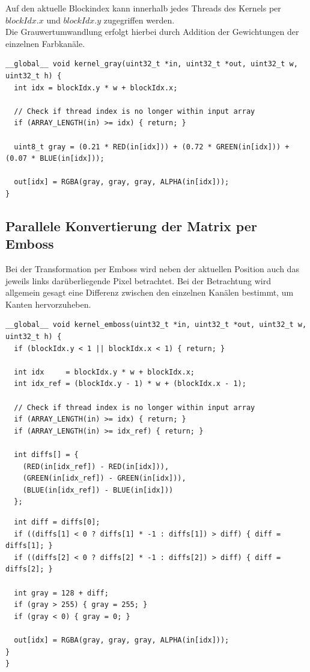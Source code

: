 \documentclass{llncs}
\begin{document}
Auf den aktuelle Blockindex kann innerhalb jedes Threads des Kernels per $blockIdx.x$ und $blockIdx.y$ zugegriffen werden.\\
\newpage
Die Grauwertumwandlung erfolgt hierbei durch Addition der Gewichtungen der einzelnen Farbkanäle. 

\begin{lstlisting}
__global__ void kernel_gray(uint32_t *in, uint32_t *out, uint32_t w, uint32_t h) {
  int idx = blockIdx.y * w + blockIdx.x;

  // Check if thread index is no longer within input array
  if (ARRAY_LENGTH(in) >= idx) { return; }

  uint8_t gray = (0.21 * RED(in[idx])) + (0.72 * GREEN(in[idx])) + (0.07 * BLUE(in[idx]));

  out[idx] = RGBA(gray, gray, gray, ALPHA(in[idx]));
}
\end{lstlisting}

%
\subsection{Parallele Konvertierung der Matrix per Emboss}
%

Bei der Transformation per Emboss wird neben der aktuellen Position auch das jeweils links darüberliegende Pixel betrachtet. Bei der Betrachtung wird allgemein gesagt eine Differenz zwischen den einzelnen Kanälen bestimmt, um Kanten hervorzuheben.

\begin{lstlisting}
__global__ void kernel_emboss(uint32_t *in, uint32_t *out, uint32_t w, uint32_t h) {
  if (blockIdx.y < 1 || blockIdx.x < 1) { return; }

  int idx     = blockIdx.y * w + blockIdx.x;
  int idx_ref = (blockIdx.y - 1) * w + (blockIdx.x - 1);

  // Check if thread index is no longer within input array
  if (ARRAY_LENGTH(in) >= idx) { return; }
  if (ARRAY_LENGTH(in) >= idx_ref) { return; }

  int diffs[] = {
    (RED(in[idx_ref]) - RED(in[idx])),
    (GREEN(in[idx_ref]) - GREEN(in[idx])),
    (BLUE(in[idx_ref]) - BLUE(in[idx]))
  };
\end{lstlisting}
\newpage
\begin{lstlisting}
  int diff = diffs[0];
  if ((diffs[1] < 0 ? diffs[1] * -1 : diffs[1]) > diff) { diff = diffs[1]; }
  if ((diffs[2] < 0 ? diffs[2] * -1 : diffs[2]) > diff) { diff = diffs[2]; }

  int gray = 128 + diff;
  if (gray > 255) { gray = 255; }
  if (gray < 0) { gray = 0; }

  out[idx] = RGBA(gray, gray, gray, ALPHA(in[idx]));
}
}
\end{lstlisting}
%
\end{document}
